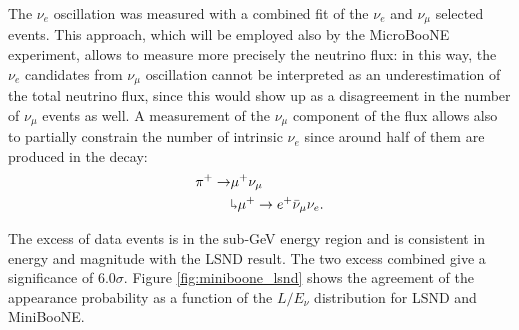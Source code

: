 The $\nu_{e}$ oscillation was measured with a combined fit of the $\nu_{e}$ and $\nu_{\mu}$ selected events. This approach, which will be employed also by the MicroBooNE experiment, allows to measure more precisely the neutrino flux: in this way, the $\nu_e$ candidates from $\nu_{\mu}$ oscillation cannot be interpreted as an underestimation of the total neutrino flux, since this would show up as a disagreement in the number of $\nu_{\mu}$ events as well. A measurement of the $\nu_{\mu}$ component of the flux allows also to partially constrain the number of intrinsic $\nu_e$ since around half of them are produced in the decay:
\begin{align}
    \pi^+ \rightarrow & \mu^+\nu_{\mu}\\
    & \rotatebox[origin=c]{180}{$\Lsh$}	 \mu^{+} \rightarrow e^+\bar{\nu}_{\mu}\nu_{e}.
\end{align}

The excess of data events is in the sub-GeV energy region and is consistent in energy and magnitude with the LSND result. The two excess combined give a significance of $6.0\sigma$. Figure \ref{fig:miniboone_lsnd} shows the agreement of the appearance probability as a function of the $L/E_{\nu}$ distribution for LSND and MiniBooNE. 

